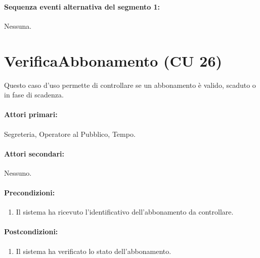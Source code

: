 \documentclass{article}
\begin{document}
	\paragraph{Sequenza eventi alternativa del segmento 1:} Nessuna.	
	
	
	
	
	
	
	
	
	\newpage

\section*{VerificaAbbonamento (CU 26)}
    
   \indent\indent  Questo caso d'uso permette di controllare se un abbonamento è valido, scaduto o in fase di scadenza.
    
    \paragraph{Attori primari:}Segreteria, Operatore al Pubblico, 	Tempo.
	
	\paragraph{Attori secondari:}Nessuno.
	
	\paragraph{Precondizioni:}
\begin{enumerate}[itemsep=8pt,parsep=0pt]
\item Il sistema ha ricevuto l'identificativo dell'abbonamento da controllare.
\end{enumerate}	
	\paragraph{Postcondizioni:}
\begin{enumerate}[itemsep=8pt,parsep=0pt]
\item Il sistema ha verificato lo stato dell'abbonamento.
\end{enumerate}	
	
\end{document}
